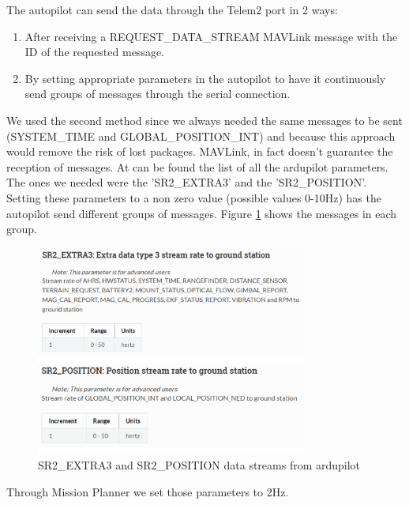 The autopilot can send the data through the Telem2 port in 2 ways:
\begin{enumerate}
    \item After receiving a REQUEST\_DATA\_STREAM MAVLink message with the ID of the requested message.
    \item By setting appropriate parameters in the autopilot to have it continuously send groups of messages through the serial connection.
\end{enumerate}
We used the second method since we always needed the same messages to be sent (SYSTEM\_TIME and GLOBAL\_POSITION\_INT) and because this approach would remove the risk of lost packages. MAVLink, in fact doesn't guarantee the reception of messages.
At \cite{ardupilot-params} can be found the list of all the ardupilot parameters. The ones we needed were the 'SR2\_EXTRA3' and the 'SR2\_POSITION'. Setting these parameters to a non zero value (possible values 0-10Hz) has the autopilot send different groups of messages. Figure \ref{fig:ardupilot-groups} shows the messages in each group.
\begin{figure}[H]
    \centering
    \includegraphics[width=0.8\textwidth]{images/ardupilot-groups.png}
    \caption{SR2\_EXTRA3 and SR2\_POSITION data streams from ardupilot\cite{ardupilot-params}}
    \label{fig:ardupilot-groups}
\end{figure}
Through Mission Planner we set those parameters to 2Hz.
